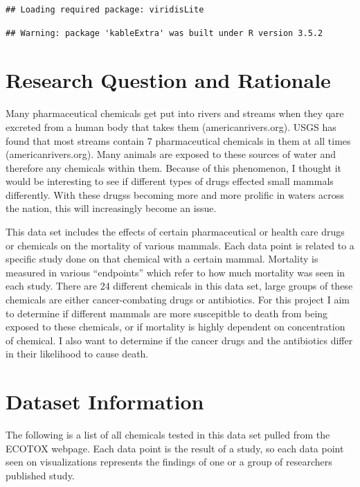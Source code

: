 \documentclass[12pt,]{article}
\begin{document}
\begin{verbatim}
## Loading required package: viridisLite
\end{verbatim}

\begin{verbatim}
## Warning: package 'kableExtra' was built under R version 3.5.2
\end{verbatim}

\section{Research Question and
Rationale}\label{research-question-and-rationale}

Many pharmaceutical chemicals get put into rivers and streams when they
qare excreted from a human body that takes them (americanrivers.org).
USGS has found that most streams contain 7 pharmaceutical chemicals in
them at all times (americanrivers.org). Many animals are exposed to
these sources of water and therefore any chemicals within them. Because
of this phenomenon, I thought it would be interesting to see if
different types of drugs effected small mammals differently. With these
drugss becoming more and more prolific in waters across the nation, this
will increasingly become an issue.

This data set includes the effects of certain pharmaceutical or health
care drugs or chemicals on the mortality of various mammals. Each data
point is related to a specific study done on that chemical with a
certain mammal. Mortality is measured in various ``endpoints'' which
refer to how much mortality was seen in each study. There are 24
different chemicals in this data set, large groups of these chemicals
are either cancer-combating drugs or antibiotics. For this project I aim
to determine if different mammals are more suscepitble to death from
being exposed to these chemicals, or if mortality is highly dependent on
concentration of chemical. I also want to determine if the cancer drugs
and the antibiotics differ in their likelihood to cause death.

\newpage

\section{Dataset Information}\label{dataset-information}

The following is a list of all chemicals tested in this data set pulled
from the ECOTOX webpage. Each data point is the result of a study, so
each data point seen on visualizations represents the findings of one or
a group of researchers published study.
\end{document}
